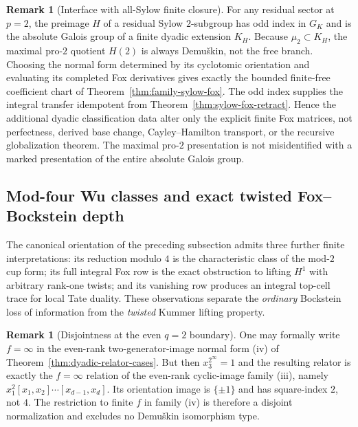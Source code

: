 \documentclass[11pt]{article}
\theoremstyle{definition}
\newtheorem{remark}[theorem]{Remark}
\begin{document}
\begin{remark}[Interface with all-Sylow finite closure]
\label{rem:dyadic-all-sylow-interface}
For any residual sector at $p=2$, the preimage
$H$ of a residual Sylow $2$-subgroup has odd
index in $G_K$ and is the absolute Galois
group of a finite dyadic extension $K_H$.
Because $\mu_2\subset K_H$, the maximal
pro-$2$ quotient $H(2)$ is always
Demu\v{s}kin, not the free branch.
Choosing the normal form determined by its
cyclotomic orientation and evaluating its
completed Fox derivatives gives exactly
the bounded finite-free coefficient chart
of Theorem~\ref{thm:family-sylow-fox}.
The odd index supplies the integral
transfer idempotent from
Theorem~\ref{thm:sylow-fox-retract}.
Hence the additional dyadic classification
data alter only the explicit finite
Fox matrices, not perfectness, derived base
change, Cayley--Hamilton transport, or
the recursive globalization theorem.
The maximal pro-$2$ presentation is not
misidentified with a marked presentation
of the entire absolute Galois group.
\end{remark}

\subsection{Mod-four Wu classes and exact twisted Fox--Bockstein depth}
\label{subsec:dyadic-fox-wu-tate}

The canonical orientation of the preceding subsection admits three further
finite interpretations: its reduction modulo $4$ is the characteristic
class of the mod-$2$ cup form; its full integral Fox row is the exact
obstruction to lifting $H^1$ with arbitrary rank-one twists; and its
vanishing row produces an integral top-cell trace for local Tate
duality.  These observations separate the \emph{ordinary} Bockstein
loss of information from the \emph{twisted} Kummer lifting property.

\begin{remark}[Disjointness at the even $q=2$ boundary]
\label{rem:dyadic-even-infinity-boundary}
One may formally write $f=\infty$ in the even-rank
two-generator-image normal form (iv) of
Theorem~\ref{thm:dyadic-relator-cases}.
But then $x_3^{2^\infty}=1$ and the resulting
relator is exactly the $f=\infty$ relation of
the even-rank cyclic-image family (iii),
namely $x_1^2[x_1,x_2]\cdots[x_{d-1},x_d]$.
Its orientation image is $\{\pm1\}$ and
has square-index $2$, not $4$.
The restriction to finite $f$ in family (iv)
is therefore a disjoint normalization and
excludes no Demu\v{s}kin isomorphism type.
\end{remark}
\end{document}
